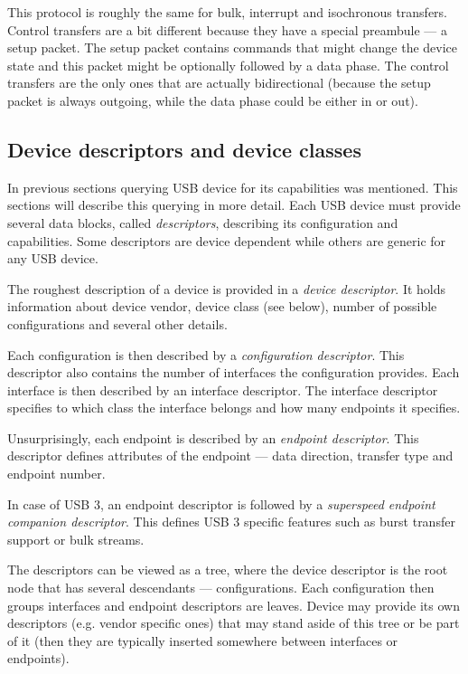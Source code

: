 This protocol is roughly the same for bulk, interrupt and isochronous
transfers. Control transfers are a bit different because they have a special
preambule — a setup packet. The setup packet contains commands that might
change the device state and this packet might be optionally followed by a data
phase. The control transfers are the only ones that are actually bidirectional
(because the setup packet is always outgoing, while the data phase could be
either in or out).

\subsection{Device descriptors and device classes}

In previous sections querying USB device for its capabilities was mentioned.
This sections will describe this querying in more detail. Each USB device must
provide several data blocks, called \textit{descriptors}, describing its
configuration and capabilities. Some descriptors are device dependent while
others are generic for any USB device.

The roughest description of a device is provided in a \textit{device
descriptor}. It holds information about device vendor, device class (see
below), number of possible configurations and several other details.

Each configuration is then described by a \textit{configuration descriptor}.
This descriptor also contains the number of interfaces the configuration
provides. Each interface is then described by an interface descriptor. The
interface descriptor specifies to which class the interface belongs and how
many endpoints it specifies.

Unsurprisingly, each endpoint is described by an \textit{endpoint descriptor}.
This descriptor defines attributes of the endpoint — data direction, transfer
type and endpoint number.

In case of USB 3, an endpoint descriptor is followed by a \textit{superspeed
endpoint companion descriptor}. This defines USB 3 specific features such as
burst transfer support or bulk streams.

The descriptors can be viewed as a tree, where the device descriptor is the
root node that has several descendants — configurations. Each configuration
then groups interfaces and endpoint descriptors are leaves. Device may provide
its own descriptors (e.g. vendor specific ones) that may stand aside of this
tree or be part of it (then they are typically inserted somewhere between
interfaces or endpoints).

